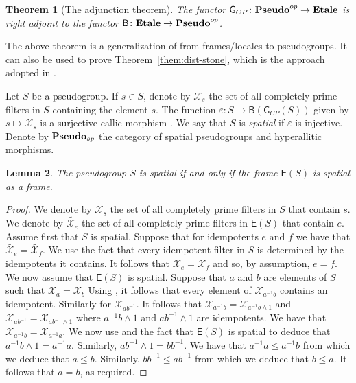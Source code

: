 \documentclass[a4paper]{amsart}
\newtheorem{theorem}{Theorem}[section]
\newtheorem{lemma}[theorem]{Lemma}
\begin{document}
\begin{theorem}[The adjunction theorem]\label{them:adjunction-theorem} The functor
$\mathsf{G}_{CP} \colon \mbox{\bf Pseudo}^{op} \rightarrow \mbox{\bf Etale}$ is right
adjoint to the functor $\mathsf{B} \colon \mbox{\bf Etale} \rightarrow \mbox{\bf Pseudo}^{op}$.
\end{theorem}

The above theorem is a generalization of \cite[Theorem II.1.4]{Johnstone} from frames/locales to pseudogroups.
It can also be used to prove Theorem~\ref{them:dist-stone}, which is the approach adopted in \cite{LL}.

Let $S$ be a pseudogroup.
If $s \in S$, denote by $\mathscr{X}_{s}$ the set of all completely prime filters in $S$ containing the element $s$.
The function $\varepsilon \colon S \rightarrow \mathsf{B}(\mathsf{G}_{CP}(S))$ given by $s \mapsto \mathscr{X}_{s}$
is a surjective callic morphism \cite[Proposition 2.9, part (1) of Proposition 2.12, Corollary 2.18, Lemma 2.21]{LL}.
We say that $S$ is {\em spatial} if $\varepsilon$ is injective.
Denote by  $\mbox{\bf Pseudo}_{sp}$ the category of spatial pseudogroups and hyperallitic morphisms.

\begin{lemma}\label{lem:spatial} 
The pseudogroup $S$ is spatial if and only if the frame $\mathsf{E}(S)$ is spatial as a frame.
\end{lemma}
\begin{proof} We denote by $\mathscr{X}_{s}$ the set of all completely prime filters in $S$ that contain $s$.
We denote by $\widetilde{\mathscr{X}_{e}}$  the set of all completely prime filters in $\mathsf{E}(S)$ that contain $e$.
Assume first that $S$ is spatial.
Suppose that for idempotents $e$ and $f$ we have that $\widetilde{\mathscr{X}_{e}} = \widetilde{\mathscr{X}_{f}}$.
We use the fact that every idempotent filter in $S$ is determined by the idempotents it contains. 
It follows that $\mathscr{X}_{e} = \mathscr{X}_{f}$ and so, by assumption, $e = f$.
We now assume that $\mathsf{E}(S)$ is spatial.
Suppose that $a$ and $b$ are elements of $S$ such that $\mathscr{X}_{a} = \mathscr{X}_{b}$ 
Using \cite[part (2) and (3) of Lemma 2.6]{LL}, it follows that every element of  $\mathscr{X}_{a^{-1}b}$ 
contains an idempotent. Similarly for $\mathscr{X}_{ab^{-1}}$.
It follows that 
$\mathscr{X}_{a^{-1}b} = \mathscr{X}_{a^{-1}b \wedge 1}$
and  
$\mathscr{X}_{ab^{-1}} = \mathscr{X}_{ab^{-1} \wedge 1}$
where $a^{-1}b \wedge 1$ and $ab^{-1} \wedge 1$ are idempotents.
We have that
$\mathscr{X}_{a^{-1}b} = \mathscr{X}_{a^{-1}a}$.
We now use \cite[part (2) of Lemma 2.2]{LL} and the fact that $\mathsf{E}(S)$ is spatial
to deduce that $a^{-1}b \wedge 1 = a^{-1}a$.
Similarly, $ab^{-1} \wedge 1 = bb^{-1}$.
We have that $a^{-1}a \leq a^{-1}b$ from which we deduce that $a \leq b$.
Similarly, $bb^{-1} \leq ab^{-1}$ from which we deduce that $b \leq a$.
It follows that $a = b$, as required.
\end{proof}
\end{document}
